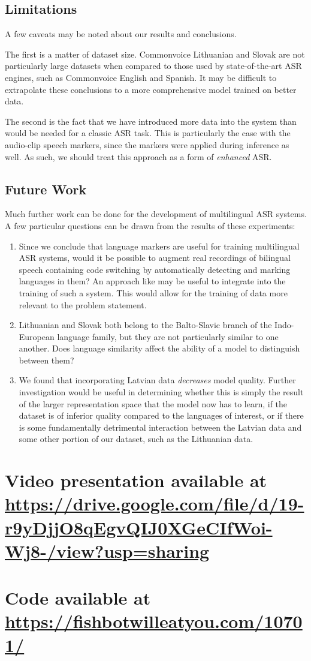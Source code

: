 \documentclass{article}
\begin{document}
  \subsection{Limitations}
  A few caveats may be noted about our results and conclusions.

  The first is a matter of dataset size. Commonvoice Lithuanian and Slovak are not particularly large datasets when compared to those used by state-of-the-art ASR engines, such as Commonvoice English and Spanish. It may be difficult to extrapolate these conclusions to a more comprehensive model trained on better data.

  The second is the fact that we have introduced more data into the system than would be needed for a classic ASR task. This is particularly the case with the audio-clip speech markers, since the markers were applied during inference as well. As such, we should treat this approach as a form of \emph{enhanced} ASR.
  \subsection{Future Work}
  Much further work can be done for the development of multilingual ASR systems. A few particular questions can be drawn from the results of these experiments:
  \begin{enumerate}
    \item Since we conclude that language markers are useful for training multilingual ASR systems, would it be possible to augment real recordings of bilingual speech containing code switching by automatically detecting and marking languages in them? An approach like \cite{Yilmaz} may be useful to integrate into the training of such a system. This would allow for the training of data more relevant to the problem statement.
    \item Lithuanian and Slovak both belong to the Balto-Slavic branch of the Indo-European language family, but they are not particularly similar to one another. Does language similarity affect the ability of a model to distinguish between them?
    \item We found that incorporating Latvian data \emph{decreases} model quality. Further investigation would be useful in determining whether this is simply the result of the larger representation space that the model now has to learn, if the dataset is of inferior quality compared to the languages of interest, or if there is some fundamentally detrimental interaction between the Latvian data and some other portion of our dataset, such as the Lithuanian data.
  \end{enumerate}
  \newpage
  
  
  \section*{Video presentation available at \url{https://drive.google.com/file/d/19-r9yDjjO8qEgvQIJ0XGeCIfWoi-Wj8-/view?usp=sharing}}
  \section*{Code available at \url{https://fishbotwilleatyou.com/10701/}}
\end{document}

